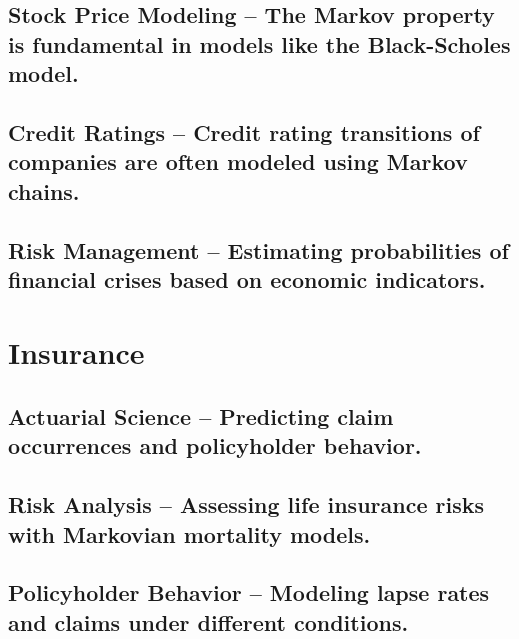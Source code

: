 \documentclass[
  letterpaper,
  DIV=11,
  numbers=noendperiod]{scrreprt}
\begin{document}
\subsection{Stock Price Modeling -- The Markov property is fundamental
in models like the Black-Scholes
model.}\label{stock-price-modeling-the-markov-property-is-fundamental-in-models-like-the-black-scholes-model.}

\subsection{Credit Ratings -- Credit rating transitions of companies are
often modeled using Markov
chains.}\label{credit-ratings-credit-rating-transitions-of-companies-are-often-modeled-using-markov-chains.}

\subsection{Risk Management -- Estimating probabilities of financial
crises based on economic
indicators.}\label{risk-management-estimating-probabilities-of-financial-crises-based-on-economic-indicators.}

\section{Insurance}\label{insurance}

\subsection{Actuarial Science -- Predicting claim occurrences and
policyholder
behavior.}\label{actuarial-science-predicting-claim-occurrences-and-policyholder-behavior.}

\subsection{Risk Analysis -- Assessing life insurance risks with
Markovian mortality
models.}\label{risk-analysis-assessing-life-insurance-risks-with-markovian-mortality-models.}

\subsection{Policyholder Behavior -- Modeling lapse rates and claims
under different
conditions.}\label{policyholder-behavior-modeling-lapse-rates-and-claims-under-different-conditions.}
\end{document}
